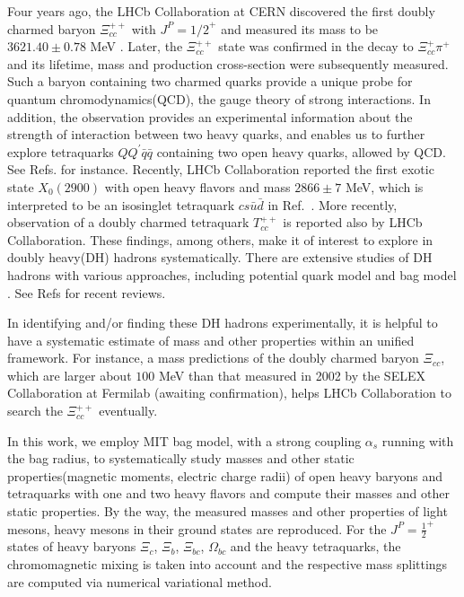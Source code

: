 \documentclass[12pt,onecolumn,floatfix,nofootinbib]{revtex4}
\begin{document}
Four years ago, the LHCb Collaboration at CERN discovered the first doubly
charmed baryon $\Xi _{cc}^{++}$ with $J^{P}={1/2}^{+}$ and measured its mass
to be $3621.40\pm 0.78$ MeV \cite{Aaij:2017ueg}. Later, the $\Xi _{cc}^{++}$
state was confirmed in the decay to $\Xi _{cc}^{+}\pi ^{+}$\cite{LhcXi:prl18}
and its lifetime, mass and production cross-section were subsequently
measured\cite{LhcXiLf:prl18,LhcXcc:cp20}. Such a baryon containing two
charmed quarks provide a unique probe for quantum chromodynamics(QCD), the
gauge theory of strong interactions. In addition, the observation provides
an experimental information about the strength of interaction between two
heavy quarks, and enables us to further explore tetraquarks $QQ^{\prime }%
\bar{q}\bar{q}$ containing two open heavy quarks, allowed by QCD. See Refs.
\cite{Karliner:2017qjm,Eichten:2017ffp,Luo:2017eub} for instance. Recently,
LHCb Collaboration reported the first exotic state $X_{0}(2900)$ with open
heavy flavors and mass $2866\pm 7$ MeV\cite{LHCb:2020kd}, which is
interpreted to be an isosinglet tetraquark $cs\bar{u}\bar{d}$ in Ref.~\cite%
{Karliner:2020vsi}. More recently, observation of a doubly charmed
tetraquark $T_{cc}^{++}$ is reported also by LHCb Collaboration\cite%
{TccPoly:2021}. These findings, among others, make it of interest to
explore in doubly heavy(DH) hadrons systematically. There are extensive
studies of DH hadrons with various approaches, including potential quark
model and bag model \cite%
{Fleck:1989mb,Ebert:2004ck,Bernotas:2012nz,He:2004px,KR:2014gca,Liu:2018euh}. 
See Refs \cite{Ali:2017jda,Liu:2019zoy} for recent reviews.

In identifying and/or finding these DH hadrons experimentally, it is helpful
to have a systematic estimate of mass and other properties within an unified
framework. For instance, a mass predictions \cite{Ebert:2004ck,KR:2014gca}
of the doubly charmed baryon $\Xi _{cc}$, which are larger about $100$ MeV
than that measured in 2002 by the SELEX Collaboration at Fermilab \cite%
{Moinester:2002uw}(awaiting confirmation), helps LHCb Collaboration to
search the $\Xi _{cc}^{++}$\cite{Aaij:2017ueg} eventually.

In this work, we employ MIT bag model, with a strong coupling $\alpha _{s}$
running with the bag radius, to systematically study masses and other static
properties(magnetic moments, electric charge radii) of open heavy baryons
and tetraquarks with one and two heavy flavors and compute their masses and
other static properties. By the way, the measured masses and other
properties of light mesons, heavy mesons in their ground states are
reproduced. For the $J^{P}={\frac{1}{2}}^{+}$ states of heavy baryons $\Xi
_{c}$, $\Xi _{b}$, $\Xi _{bc}$, $\Omega _{bc}$ and the heavy tetraquarks,
the chromomagnetic mixing is taken into account and the respective mass
splittings are computed via numerical variational method.
\end{document}
